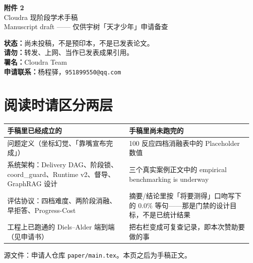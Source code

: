 \documentclass[12pt,a4paper]{article}
\begin{document}
\begin{center}
{\LARGE\bfseries 附件 2}\\[0.6em]
{\Large Cloudra 现阶段学术手稿}\\[0.4em]
{\large Manuscript draft —— 仅供宇树「天才少年」申请备查}
\end{center}

\vspace{1.2em}

\noindent\textbf{状态：}尚未投稿，不是预印本，不是已发表论文。\\
\textbf{请勿：}转发、上网、当作已发表成果引用。\\
\textbf{署名：}Cloudra Team\\
\textbf{申请联系：}杨程驿，\texttt{951899550@qq.com}

\vspace{0.8em}
\section*{阅读时请区分两层}

\renewcommand{\arraystretch}{1.35}
\begin{tabularx}{\textwidth}{X X}
\toprule
\textbf{手稿里已经成立的} & \textbf{手稿里尚未跑完的} \\
\midrule
问题定义（坐标幻觉、「靠嘴宣布完成」） &
100 反应四档消融表中的 Placeholder 数值 \\
系统架构：Delivery DAG、阶段锁、coord\_guard、Runtime v2、督导、GraphRAG 设计 &
三个真实案例正文中的 empirical benchmarking is underway \\
评估协议：四档难度、两阶段消融、早拒答、Progress-Cost &
摘要/结论里按「将要测得」口吻写下的 $0.0\%$ 等句——那是门禁的设计目标，不是已统计结果 \\
工程上已跑通的 Diels--Alder 端到端（见申请书） &
把右栏变成可复查记录，即本次赞助要做的事 \\
\bottomrule
\end{tabularx}

\vspace{1.2em}
\noindent 源文件：申请人仓库 \texttt{paper/main.tex}。本页之后为手稿正文。
\end{document}

